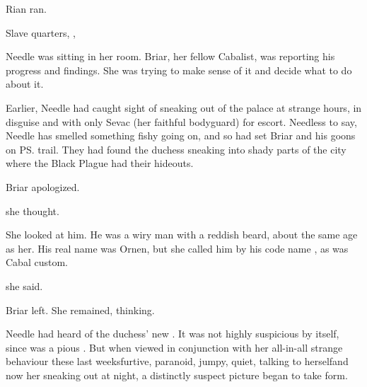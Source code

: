 Rian ran. 









\begin{comment}
\section{Needle suspects}
\end{comment}
\placestamp
  {Slave quarters, \CastlePelidor, }

Needle was sitting in her room. 
Briar, her fellow Cabalist, was reporting his progress and findings. 
She was trying to make sense of it and decide what to do about it. 

Earlier, Needle had caught sight of \Tiroco{} sneaking out of the palace at strange hours, in disguise and with only Sevac (her faithful bodyguard) for escort. 
Needless to say, Needle has smelled something fishy going on, and so had set Briar and his goons on \ps{\Tiroco}{} trail. 
They had found the duchess sneaking into shady parts of the city where the Black Plague had their hideouts. 

 Briar apologized. 

 she thought.

She looked at him. 
He was a wiry man with a reddish beard, about the same age as her. 
His real name was Ornen, but she called him by his code name , as was Cabal custom. 

 she said. 



Briar left. 
She remained, thinking. 

Needle had heard of the duchess' new . 
It was not highly suspicious by itself, since \Tiroco{} was a pious . 
But when viewed in conjunction with her all-in-all strange behaviour these last weeks\dash furtive, paranoid, jumpy, quiet, talking to herself\dash and now her sneaking out at night, a distinctly suspect picture began to take form. 

